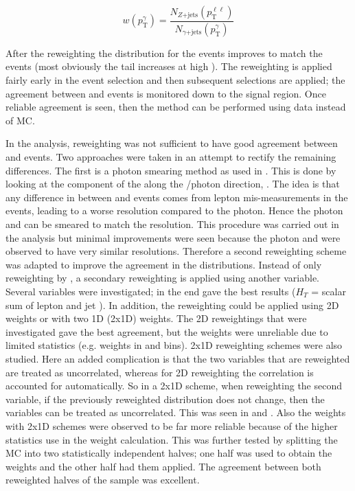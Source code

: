 \begin{equation}
w(p_\text{T}^\gamma) = \frac{N_{Z\text{+jets}}(p_\text{T}^{\ell\ell})}{N_{\gamma\text{+jets}}(p_\text{T}^\gamma)}
\end{equation}

\noindent After the reweighting the \etmiss distribution for the \gjets events improves to match the \Zjets events (most obviously the tail increases at high \etmiss). The reweighting is applied fairly early in the event selection and then subsequent selections are applied; the agreement between \gjets and \Zjets events is monitored down to the signal region. Once reliable agreement is seen, then the method can be performed using data instead of MC.

In the \monoZ analysis, \pt reweighting was not sufficient to have good agreement between \gjets and \Zjets events. Two approaches were taken in an attempt to rectify the remaining differences. The first is a photon smearing method as used in \cite{Galster:2151990}. This is done by looking at the component of the \etmiss along the \Z/photon direction, \etmisspar. The idea is that any difference in \etmisspar between \Zjets and \gjets events comes from lepton mis-measurements in the \Zjets events, leading to a worse \Z resolution compared to the photon. Hence the photon \pt and \etmisspar can be smeared to match the \Z resolution. This procedure was carried out in the \monoZ analysis but minimal improvements were seen because the photon and \Z were observed to have very similar resolutions. Therefore a second reweighting scheme was adapted to improve the agreement in the \etmiss distributions. Instead of only reweighting by \pt, a secondary reweighting is applied using another variable. Several variables were investigated; in the end \etmissht gave the best results ($H_T$ = scalar sum of lepton \pt and jet \pt). In addition, the reweighting could be applied using 2D weights or with two 1D (2x1D) weights. The 2D reweightings that were investigated gave the best \etmiss agreement, but the weights were unreliable due to limited statistics (e.g. weights in \pt and \etmissht bins). 2x1D reweighting schemes were also studied. Here an added complication is that the two variables that are reweighted are treated as uncorrelated, whereas for 2D reweighting the correlation is accounted for automatically. So in a 2x1D scheme, when reweighting the second variable, if the previously reweighted \pt distribution does not change, then the variables can be treated as uncorrelated. This was seen in \pt and \etmissht. Also the weights with 2x1D schemes were observed to be far more reliable because of the higher statistics use in the weight calculation. This was further tested by splitting the \gjets MC into two statistically independent halves; one half was used to obtain the weights and the other half had them applied. The agreement between both reweighted halves of the \gjets sample was excellent. 

